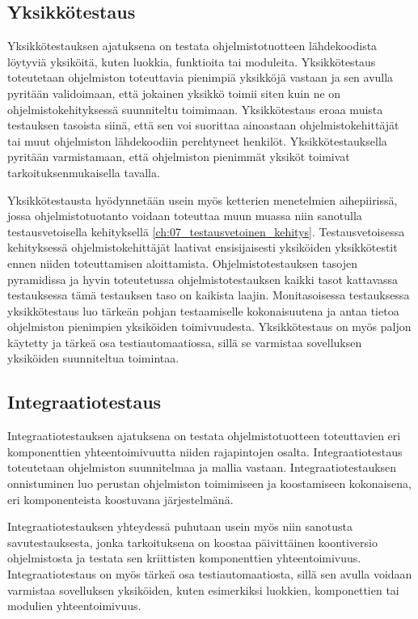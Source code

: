   \subsection{Yksikkötestaus} \label{ch:07_yksikkotestaus}

  Yksikkötestauksen ajatuksena on testata ohjelmistotuotteen lähdekoodista löytyviä yksiköitä, kuten luokkia, funktioita tai moduleita.
  Yksikkötestaus toteutetaan ohjelmiston toteuttavia pienimpiä yksikköjä vastaan ja sen avulla pyritään validoimaan, että jokainen yksikkö toimii siten kuin ne on ohjelmistokehityksessä suunniteltu toimimaan.
  Yksikkötestaus eroaa muista testauksen tasoista siinä, että sen voi suorittaa ainoastaan ohjelmistokehittäjät tai muut ohjelmiston lähdekoodiin perehtyneet henkilöt.
  Yksikkötestauksella pyritään varmistamaan, että ohjelmiston pienimmät yksiköt toimivat tarkoituksenmukaisella tavalla.

  Yksikkötestausta hyödynnetään usein myös ketterien menetelmien aihepiirissä, jossa ohjelmistotuotanto voidaan toteuttaa muun muassa niin sanotulla testausvetoisella kehityksellä \ref{ch:07_testausvetoinen_kehitys}.
  Testausvetoisessa kehityksessä ohjelmistokehittäjät laativat ensisijaisesti yksiköiden yksikkötestit ennen niiden toteuttamisen aloittamista.
  Ohjelmistotestauksen tasojen pyramidissa ja hyvin toteutetussa ohjelmistotestauksen kaikki tasot kattavassa testauksessa tämä testauksen taso on kaikista laajin.
  Monitasoisessa testauksessa yksikkötestaus luo tärkeän pohjan testaamiselle kokonaisuutena ja antaa tietoa ohjelmiston pienimpien yksiköiden toimivuudesta.
  Yksikkötestaus on myös paljon käytetty ja tärkeä osa testiautomaatiossa, sillä se varmistaa sovelluksen yksiköiden suunniteltua toimintaa.

  \subsection{Integraatiotestaus} \label{ch:07_integraatiotestaus}

  Integraatiotestauksen ajatuksena on testata ohjelmistotuotteen toteuttavien eri komponenttien yhteentoimivuutta niiden rajapintojen osalta.
  Integraatiotestaus toteutetaan ohjelmiston suunnitelmaa ja mallia vastaan.
  Integraatiotestauksen onnistuminen luo perustan ohjelmiston toimimiseen ja koostamiseen kokonaisena, eri komponenteista koostuvana järjestelmänä.

  Integraatiotestauksen yhteydessä puhutaan usein myös niin sanotusta savutestauksesta, jonka tarkoituksena on koostaa päivittäinen koontiversio ohjelmistosta ja testata sen kriittisten komponenttien yhteentoimivuus.
  Integraatiotestaus on myös tärkeä osa testiautomaatiosta, sillä sen avulla voidaan varmistaa sovelluksen yksiköiden, kuten esimerkiksi luokkien, komponettien tai modulien yhteentoimivuus.

